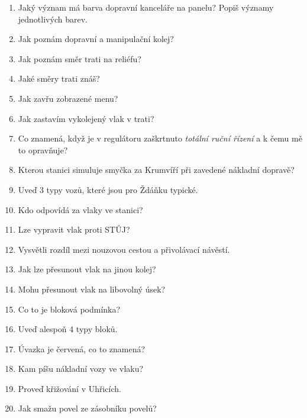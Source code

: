 \documentclass[12pt,a4paper]{article}
\begin{document}
\begin{enumerate}
	\item Jaký význam má barva dopravní kanceláře na panelu? Popiš významy jednotlivých barev.
	
	\item Jak poznám dopravní a manipulační kolej?
	
	\item Jak poznám směr trati na reliéfu?
	
	\item Jaké směry trati znáš?
	
	\item Jak zavřu zobrazené menu?
	
	\item Jak zastavím vykolejený vlak v trati?
	
	\item Co znamená, když je v regulátoru zaškrtnuto \textit{totální ruční řízení} a k čemu mě to opravňuje?
	
	\item Kterou stanici simuluje smyčka za Krumvíří při zavedené nákladní dopravě?
	
	\item Uveď 3 typy vozů, které jsou pro Ždáňku typické.
	
	\item Kdo odpovídá za vlaky ve stanici?
	
	\item Lze vypravit vlak proti STŮJ?
	
	\item Vysvětli rozdíl mezi nouzovou cestou a přivolávací návěstí.
	
	\item Jak lze přesunout vlak na jinou kolej?

	\item Mohu přesunout vlak na libovolný úsek?
	
	\item Co to je bloková podmínka?
	
	\item Uveď alespoň 4 typy bloků.
	
	\item Úvazka je červená, co to znamená?
	
	\item Kam píšu nákladní vozy ve vlaku?
	
	\item Proveď křižování v Uhřicích.
	
	\item Jak smažu povel ze zásobníku povelů?
	

\end{enumerate}
\end{document}
